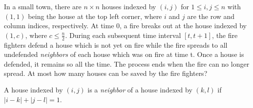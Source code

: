 In a small town, there are $n \times n$ houses indexed by $(i, j)$ for $1 \leq i, j \leq n$ with $(1, 1)$ being the house at the top left corner, where $i$ and $j$ are the row and column indices, respectively. At time 0, a fire breaks out at the house indexed by $(1, c)$, where $c \leq \frac{n}{2}$. During each subsequent time interval $[t, t+1]$, the fire fighters defend a house which is not yet on fire while the fire spreads to all undefended \emph{neighbors} of each house which was on fire at time t. Once a house is defended, it remains so all the time. The process ends when the fire can no longer spread. At most how many houses can be saved by the fire fighters?

A house indexed by $(i, j)$ is a \emph{neighbor} of a house indexed by $(k, l)$ if $|i - k| + |j - l|=1$.